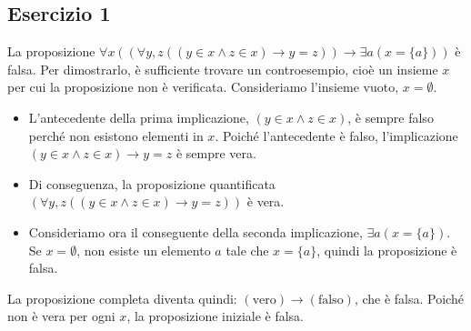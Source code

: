 \subsection*{Esercizio 1}
La proposizione $\forall x((\forall y,z((y\in x\wedge z\in x)\rightarrow y=z))\rightarrow\exists a(x=\{a\}))$ è falsa.
Per dimostrarlo, è sufficiente trovare un controesempio, cioè un insieme $x$ per cui la proposizione non è verificata.
Consideriamo l'insieme vuoto, $x = \emptyset$.
\begin{itemize}
    \item L'antecedente della prima implicazione, $(y\in x\wedge z\in x)$, è sempre falso perché non esistono elementi in $x$. Poiché l'antecedente è falso, l'implicazione $(y\in x\wedge z\in x)\rightarrow y=z$ è sempre vera.
    \item Di conseguenza, la proposizione quantificata $(\forall y,z((y\in x\wedge z\in x)\rightarrow y=z))$ è vera.
    \item Consideriamo ora il conseguente della seconda implicazione, $\exists a(x=\{a\})$. Se $x=\emptyset$, non esiste un elemento $a$ tale che $x=\{a\}$, quindi la proposizione è falsa.
\end{itemize}
La proposizione completa diventa quindi: $(\text{vero}) \rightarrow (\text{falso})$, che è falsa. Poiché non è vera per ogni $x$, la proposizione iniziale è falsa.

